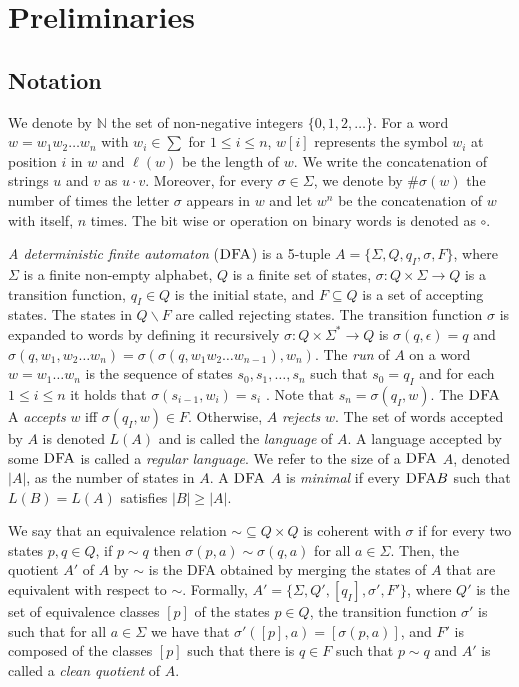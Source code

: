 \chapter{Preliminaries}
\label{ch:Preliminaries}

\section{Notation}
We denote by $\mathbb{N}$ the set of non-negative integers $\{0, 1, 2, \dots \}$. For a word $w = w_1 w_2 \dots w_n$ with $w_i \in \sum$ for $1 \leq i \leq n$, $w[i]$ represents the symbol $w_i$ at position $i$ in $w$ and $\ell(w)$ be the length of $w$. We write
the concatenation of strings $u$ and $v$ as $u \cdot v$. Moreover, for every $\sigma \in \Sigma$, we denote by $\#\sigma(w)$ the number of times the letter $\sigma$ appears in $w$ and let $w^n$ be the concatenation of $w$ with itself, $n$ times. The bit wise or operation on binary words is denoted as $\circ$.

\textit{A deterministic finite automaton} ($\textsc{DFA}$) is a 5-tuple $A = \lbrace\Sigma, Q, q_I , \sigma, F\rbrace$, where $\Sigma$ is a finite non-empty alphabet, $Q$ is a finite set of states, $\sigma : Q \times \Sigma \rightarrow Q$ is a transition function, $q_I \in Q$ is the initial state, and $F \subseteq Q$ is a set of accepting states. The states in $Q \backslash F$ are called rejecting states. The transition function $\sigma$ is expanded to words by defining it recursively $\sigma : Q \times \Sigma^* \rightarrow Q$ is $\sigma(q, \epsilon) = q$ and $\sigma(q, w_1, w_2 \dots w_n ) = \sigma(\sigma(q, w_1 w_2 \dots w_{n-1} ), w_n )$. The \textit{run} of $A$ on a word $w = w_1 \dots w_n$ is the sequence of states $s_0 , s_1 , \dots , s_n$ such that $s_0 = q_I$ and for each $1 \leq i \leq n$ it holds that $\sigma(s_{i-1} , w_i ) = s_i$ . Note that $s_n = \sigma(q_I , w)$. The $\textsc{DFA}$ A \textit{accepts} $w$ iff $\sigma(q_I , w) \in F$. Otherwise, $A$ \textit{rejects} $w$. The set of words accepted by $A$ is denoted $L(A)$ and is called the \textit{language} of $A$. A language accepted by some $\textsc{DFA}$ is called a \textit{regular language}. We refer to the size of a $\textsc{DFA}$ $A$, denoted $|A|$, as the number of states in $A$. A $\textsc{DFA}$ $A$ is \textit{minimal} if every $\textsc{DFA} B$ such that $L(B) = L(A)$ satisfies $|B| \geq |A|$.

We say that an equivalence relation $\sim \subseteq Q \times Q$ is coherent with $\sigma$ if for every two states $p, q \in Q$, if $p \sim q$ then $\sigma(p, a) \sim \sigma(q, a)$ for all $a \in \Sigma$. Then, the quotient $A'$ of $A$ by $\sim$ is the DFA obtained by merging the states of $A$ that are equivalent with respect to $\sim$. Formally, $A' = \{\Sigma, Q' , [q_I], \sigma' , F'\}$, where $Q'$ is the set of equivalence classes $[p]$ of the states $p \in Q$, the transition function $\sigma'$ is such that for all $a \in \Sigma$ we have that $\sigma' ([p], a) = [\sigma(p, a)]$, and $F'$ is composed of the classes $[p]$ such that there is $q \in F$ such that $p \sim q$ and $A'$ is called a \textit{clean quotient} of $A$.

